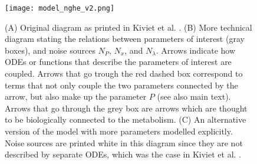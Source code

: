 \begin{figure}
	\centering
	\texttt{[image: model\_nghe\_v2.png]}
	\caption{ 
		(A) Original diagram as printed in Kiviet et al. \cite{Kiviet2014}.
		(B) More technical diagram stating the relations between parameters of interest (gray boxes), and noise sources $N_P$, $N_x$, and $N_\lambda$. Arrows indicate how ODEs or functions that describe the parameters of interest are coupled. 
		Arrows that go trough the red dashed box correspond to terms that not only couple the two parameters connected by the arrow, but also make up the parameter $P$ (see also main text).
		Arrows that go through the grey box are arrows which are thought to be biologically connected to the metabolism.
		(C) An alternative version of the model with more parameters modelled explicitly. Noise sources are printed white in this diagram since they are not described by separate ODEs, which was the case in Kiviet et al. \cite{Kiviet2014}. 
	}
	\label{fig:modeldrawing}
\end{figure}

